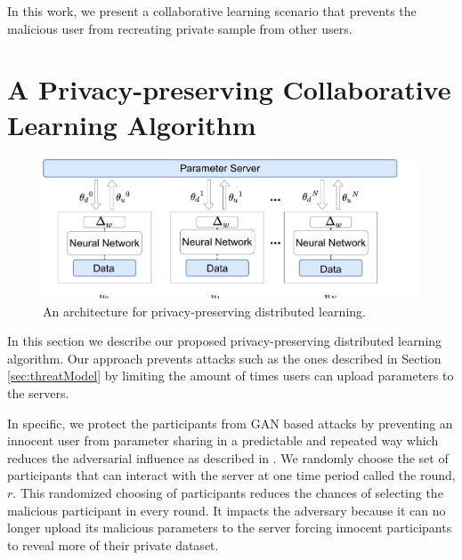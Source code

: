 \documentclass[conference]{IEEEtran}
\begin{document}

In this work, we present a collaborative learning scenario that prevents the malicious user from recreating private sample
from other users. 



\section{A Privacy-preserving Collaborative Learning Algorithm}

\begin{figure}[t]
\includegraphics[width=\textwidth, keepaspectratio]{HighLevelArch}
\caption{An architecture for privacy-preserving distributed learning.}
\label{fig:HighLevel}
\end{figure}

In this section we describe our proposed privacy-preserving distributed learning algorithm. Our approach prevents attacks such as the ones described in Section \ref{sec:threatModel} by limiting the amount of times users can upload parameters to the servers. 

In specific, we protect the participants from GAN based attacks by preventing an innocent user from parameter sharing in a predictable and repeated way which reduces the adversarial influence as described in \cite{hitaj2017deep}.  We randomly choose the set of participants that can interact with the server at one time period called the round, $r$. This randomized choosing of participants reduces the chances of selecting the malicious participant in every round. It impacts the adversary because it can no longer upload its malicious parameters to the server forcing innocent participants to reveal more of their private dataset. 
\end{document}
